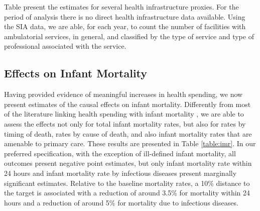 Table present the estimates for several health infrastructure proxies. For the period of analysis there is no direct health infrastructure data available. Using the SIA data, we are able, for each year, to count the number of facilities with ambulatorial services, in general, and classified by the type of service and type of professional associated with the service. 


















\subsection{Effects on Infant Mortality}

Having provided evidence of meaningful increases in health spending, we now present estimates of the causal effects on infant mortality. Differently from most of the literature linking health spending with infant mortality \citep{filmer1999,bokhari2007,moreno2015,nixon2006,gupta2002effectiveness,cremieux1999,bokhari2007}, we are able to assess the effects not only for total infant mortality rates, but also for rates by timing of death, rates by cause of death, and also infant mortality rates that are amenable to primary care. These results are presented in Table \ref{table:imr}. In our preferred specification, with the exception of ill-defined infant mortality, all outcomes present negative point estimates, but only infant mortality rate within 24 hours and infant mortality rate by infectious diseases present marginally significant estimates. Relative to the baseline mortality rates, a 10\% distance to the target is associated with a reduction of around 3.5\% for mortality within 24 hours and a reduction of around 5\% for mortality due to infectious diseases. 

